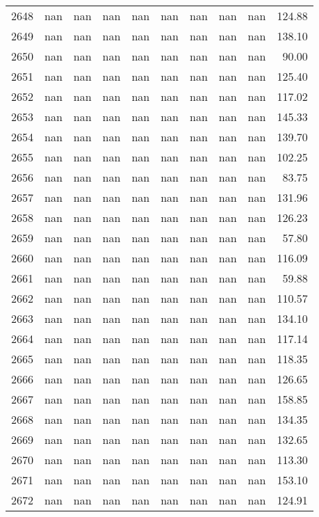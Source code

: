 \begin{tabular}{lrrrrrrrrr}
2648 & nan & nan & nan & nan & nan & nan & nan & nan & 124.88 \\
2649 & nan & nan & nan & nan & nan & nan & nan & nan & 138.10 \\
2650 & nan & nan & nan & nan & nan & nan & nan & nan & 90.00 \\
2651 & nan & nan & nan & nan & nan & nan & nan & nan & 125.40 \\
2652 & nan & nan & nan & nan & nan & nan & nan & nan & 117.02 \\
2653 & nan & nan & nan & nan & nan & nan & nan & nan & 145.33 \\
2654 & nan & nan & nan & nan & nan & nan & nan & nan & 139.70 \\
2655 & nan & nan & nan & nan & nan & nan & nan & nan & 102.25 \\
2656 & nan & nan & nan & nan & nan & nan & nan & nan & 83.75 \\
2657 & nan & nan & nan & nan & nan & nan & nan & nan & 131.96 \\
2658 & nan & nan & nan & nan & nan & nan & nan & nan & 126.23 \\
2659 & nan & nan & nan & nan & nan & nan & nan & nan & 57.80 \\
2660 & nan & nan & nan & nan & nan & nan & nan & nan & 116.09 \\
2661 & nan & nan & nan & nan & nan & nan & nan & nan & 59.88 \\
2662 & nan & nan & nan & nan & nan & nan & nan & nan & 110.57 \\
2663 & nan & nan & nan & nan & nan & nan & nan & nan & 134.10 \\
2664 & nan & nan & nan & nan & nan & nan & nan & nan & 117.14 \\
2665 & nan & nan & nan & nan & nan & nan & nan & nan & 118.35 \\
2666 & nan & nan & nan & nan & nan & nan & nan & nan & 126.65 \\
2667 & nan & nan & nan & nan & nan & nan & nan & nan & 158.85 \\
2668 & nan & nan & nan & nan & nan & nan & nan & nan & 134.35 \\
2669 & nan & nan & nan & nan & nan & nan & nan & nan & 132.65 \\
2670 & nan & nan & nan & nan & nan & nan & nan & nan & 113.30 \\
2671 & nan & nan & nan & nan & nan & nan & nan & nan & 153.10 \\
2672 & nan & nan & nan & nan & nan & nan & nan & nan & 124.91 \\

\end{tabular}
